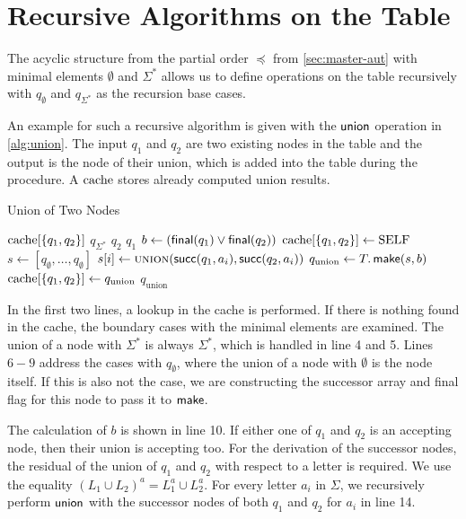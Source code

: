 \section{Recursive Algorithms on the Table}
The acyclic structure from the partial order $\preceq$ from \autoref{sec:master-aut} with minimal elements $\emptyset$ and $\Sigma^{*}$ allows us to define operations on the table recursively with $q_{\emptyset}$ and $q_{\Sigma^{*}}$ as the recursion base cases.
\par
An example for such a recursive algorithm is given with the $\operatorname{\textsf{union}}$ operation in \autoref{alg:union}. The input $q_{1}$ and $q_{2}$ are two existing nodes in the table and the output is the node of their union, which is added into the table during the procedure. A $\mathrm{cache}$ stores already computed union results.
\begin{algorithm}[htb]
\caption{Union of Two Nodes}\label{alg:union}
\begin{algorithmic}[1]
\If{$\cache[\{q_{1},q_{2}\}]$}
	\Return $\cache[\{q_{1},q_{2}\}]$
	\Return $q_{\Sigma^{*}}$
	\Return $q_{2}$
	\Return $q_{1}$
\EndIf
\State $b \gets (\operatorname{\textsf{final}}(q_{1}) \lor \operatorname{\textsf{final}}(q_{2}))$
\State $\mathrm{cache}[\{q_{1},q_{2}\}] \gets \text{SELF}$
\State $s \gets [q_{\emptyset},\dots,q_{\emptyset}]$
\State $s[i] \gets \Call{union}{\Succ(q_{1},a_{i}),\Succ(q_{2},a_{i})}$
\EndFor
\State $q_{\text{union}} \gets T.\operatorname{\textsf{make}}(s,b)$
\State $\mathrm{cache}[\{q_{1},q_{2}\}] \gets q_{\text{union}}$
\Return $q_{\text{union}}$
\EndProcedure
\end{algorithmic}
\end{algorithm}
In the first two lines, a lookup in the cache is performed. If there is nothing found in the cache, the boundary cases with the minimal elements are examined. The union of a node with $\Sigma^{*}$ is always $\Sigma^{*}$, which is handled in line 4 and 5. Lines $6-9$ address the cases with $q_{\emptyset}$, where the union of a node with $\emptyset$ is the node itself. 
If this is also not the case, we are constructing the successor array and final flag for this node to pass it to $\operatorname{\textsf{make}}$. 

\par 

The calculation of $b$ is shown in line 10. If either one of $q_{1}$ and $q_{2}$ is an accepting node, then their union is accepting too. For the derivation of the successor nodes, the residual of the union of $q_{1}$ and $q_{2}$ with respect to a letter is required. We use the equality $(L_{1} \cup L_{2})^{a} = L_{1}^{a} \cup L_{2}^{a}$. For every letter $a_{i}$ in $\Sigma$, we recursively perform $\operatorname{\textsf{union}}$ with the successor nodes of both $q_{1}$ and $q_{2}$ for $a_{i}$ in line 14.

